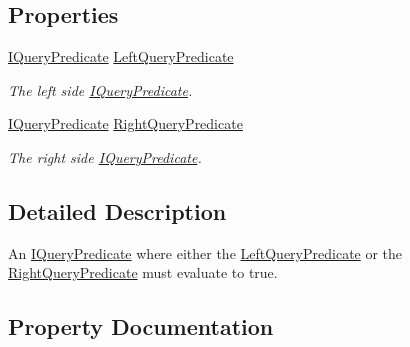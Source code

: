 \subsection*{Properties}
\begin{DoxyCompactItemize}
\item 
\hyperlink{interfaceCqrs_1_1Repositories_1_1Queries_1_1IQueryPredicate}{I\+Query\+Predicate} \hyperlink{interfaceCqrs_1_1Repositories_1_1Queries_1_1IOrQueryPredicate_a714d125899714f5aabc2d50e4ffb9834_a714d125899714f5aabc2d50e4ffb9834}{Left\+Query\+Predicate}
\begin{DoxyCompactList}\small\item\em The left side \hyperlink{interfaceCqrs_1_1Repositories_1_1Queries_1_1IQueryPredicate}{I\+Query\+Predicate}. \end{DoxyCompactList}\item 
\hyperlink{interfaceCqrs_1_1Repositories_1_1Queries_1_1IQueryPredicate}{I\+Query\+Predicate} \hyperlink{interfaceCqrs_1_1Repositories_1_1Queries_1_1IOrQueryPredicate_a72ad26892989a09527ead9a2ecce5d47_a72ad26892989a09527ead9a2ecce5d47}{Right\+Query\+Predicate}
\begin{DoxyCompactList}\small\item\em The right side \hyperlink{interfaceCqrs_1_1Repositories_1_1Queries_1_1IQueryPredicate}{I\+Query\+Predicate}. \end{DoxyCompactList}\end{DoxyCompactItemize}


\subsection{Detailed Description}
An \hyperlink{interfaceCqrs_1_1Repositories_1_1Queries_1_1IQueryPredicate}{I\+Query\+Predicate} where either the \hyperlink{interfaceCqrs_1_1Repositories_1_1Queries_1_1IOrQueryPredicate_a714d125899714f5aabc2d50e4ffb9834_a714d125899714f5aabc2d50e4ffb9834}{Left\+Query\+Predicate} or the \hyperlink{interfaceCqrs_1_1Repositories_1_1Queries_1_1IOrQueryPredicate_a72ad26892989a09527ead9a2ecce5d47_a72ad26892989a09527ead9a2ecce5d47}{Right\+Query\+Predicate} must evaluate to true. 



\subsection{Property Documentation}
\mbox{\label{interfaceCqrs_1_1Repositories_1_1Queries_1_1IOrQueryPredicate_a714d125899714f5aabc2d50e4ffb9834_a714d125899714f5aabc2d50e4ffb9834}} 
